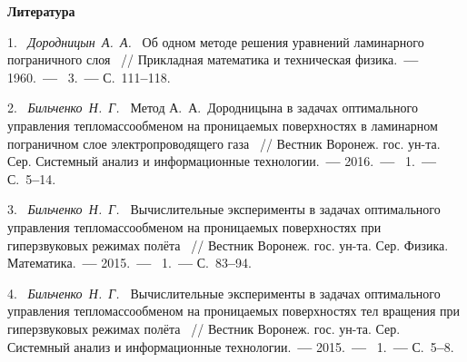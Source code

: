 \smallskip \centerline {\bf Литература} \nopagebreak



1.~%
\textit%
{Дородницын~А.~А.~} 
{%
 {Об  одном  методе  решения  
 уравнений  ламинарного  пограничного  слоя}%
~/$\!$/ 
 {Прикладная  математика  
  и  техническая  физика}.~{\textbf{---}} 
  1960.~{\textbf{---}} 
  \No~3.~{\textbf{---}} 
  С.~111{\textbf{--}}118.%
  }  



2.~%
\textit%
{Бильченко~Н.~Г.~} 
{%
  {Метод  А.~А.~Дородницына  
  в  задачах  оптимального  управления 
  тепломассообменом  на  проницаемых  поверхностях 
  в  ламинарном  пограничном  слое  
  электропроводящего  газа}%
~/$\!$/ 
  Вестник  Воронеж.  гос.  ун-та. 
  Сер.  Системный  анализ  
  и  информационные  технологии.~{\textbf{---}} 
  2016.~{\textbf{---}} 
  \No~1.~{\textbf{---}} 
  С.~5{\textbf{--}}14.%
  }



3.~%
\textit%
{Бильченко~Н.~Г.~} 
{%
 {Вычислительные  
  эксперименты 
  в  
  задачах  
  оптимального  
  управления  
  тепломассообменом 
  на  проницаемых  поверхностях 
  при  гиперзвуковых  режимах  полёта}%
~/$\!$/ 
  Вестник  Воронеж.  гос.  ун-та. 
  Сер.  Физика.  Математика.~{\textbf{---}}
  2015.~{\textbf{---}} 
  \No~1.~{\textbf{---}} 
  С.~83{\textbf{--}}94.%
  }



4.~%
\textit%
{Бильченко~Н.~Г.~}  
{%
  {Вычислительные  
   эксперименты  
   в  
   задачах  
   оптимального  
   управления 
   тепломассообменом  
   на  проницаемых  поверхностях 
   тел  вращения  
   при  гиперзвуковых  режимах  полёта}%
~/$\!$/ 
  Вестник  Воронеж.  гос.  ун-та. 
  Сер.  Системный  анализ 
  и  информационные  технологии.~{\textbf{---}} 
  2015.~{\textbf{---}} 
  \No~1.~{\textbf{---}} 
  С.~5{\textbf{--}}8.%
  }

